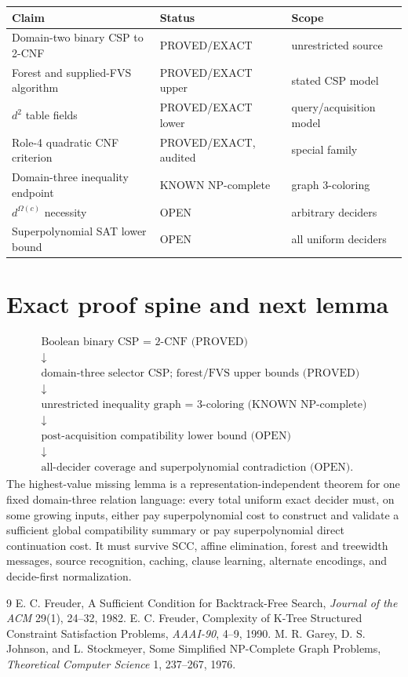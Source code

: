 \documentclass[11pt]{article}
\begin{document}
\begin{center}
\begin{tabular}{lll}
\toprule
Claim & Status & Scope\\
\midrule
Domain-two binary CSP to 2-CNF & PROVED/EXACT & unrestricted source\\
Forest and supplied-FVS algorithm & PROVED/EXACT upper & stated CSP model\\
$d^2$ table fields & PROVED/EXACT lower & query/acquisition model\\
Role-4 quadratic CNF criterion & PROVED/EXACT, audited & special family\\
Domain-three inequality endpoint & KNOWN NP-complete & graph 3-coloring\\
$d^{\Omega(c)}$ necessity & OPEN & arbitrary deciders\\
Superpolynomial SAT lower bound & OPEN & all uniform deciders\\
\bottomrule
\end{tabular}
\end{center}

\section{Exact proof spine and next lemma}
\[
\begin{array}{c}
\text{Boolean binary CSP = 2-CNF (PROVED)}\\
\downarrow\\
\text{domain-three selector CSP; forest/FVS upper bounds (PROVED)}\\
\downarrow\\
\text{unrestricted inequality graph = 3-coloring (KNOWN NP-complete)}\\
\downarrow\\
\text{post-acquisition compatibility lower bound (OPEN)}\\
\downarrow\\
\text{all-decider coverage and superpolynomial contradiction (OPEN).}
\end{array}
\]
The highest-value missing lemma is a representation-independent theorem for
one fixed domain-three relation language: every total uniform exact decider
must, on some growing inputs, either pay superpolynomial cost to construct and
validate a sufficient global compatibility summary or pay superpolynomial
direct continuation cost. It must survive SCC, affine elimination, forest and
treewidth messages, source recognition, caching, clause learning, alternate
encodings, and decide-first normalization.

\begin{thebibliography}{9}
E. C. Freuder, A Sufficient Condition for Backtrack-Free Search,
\emph{Journal of the ACM} 29(1), 24--32, 1982.
E. C. Freuder, Complexity of K-Tree Structured Constraint Satisfaction
Problems, \emph{AAAI-90}, 4--9, 1990.
M. R. Garey, D. S. Johnson, and L. Stockmeyer, Some Simplified NP-Complete
Graph Problems, \emph{Theoretical Computer Science} 1, 237--267, 1976.
\end{thebibliography}
\end{document}
